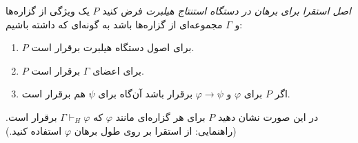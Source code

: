 \emph{اصل استقرا برای برهان در دستگاه استنتاج هیلبرت}
فرض کنید $P$ یک ویژگی از گزاره‌ها و $\Gamma$ مجموعه‌ای از گزاره‌ها باشد به گونه‌ای که داشته باشیم:
\begin{enumerate}
    \item $P$ برای اصول دستگاه هیلبرت برقرار است.
    \item $P$ برای اعضای $\Gamma$ برقرار است.
    \item اگر $P$ برای $\varphi$ و $\varphi \rightarrow \psi$ برقرار باشد آن‌گاه برای $\psi$ هم برقرار است.
\end{enumerate}
در این صورت نشان دهید $P$ برای هر گزاره‌ای مانند $\varphi$ که $\Gamma \vdash_H \varphi$ برقرار است. (راهنمایی: از استقرا بر روی طول برهان $\varphi$ استفاده کنید.)
